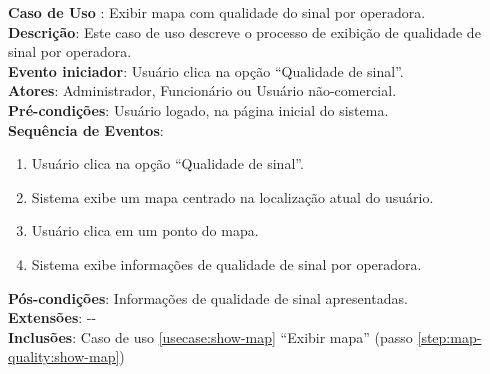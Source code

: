 \documentclass[]{politex}
\begin{document}
\noindent \textbf{Caso de Uso }: Exibir mapa com qualidade
do sinal por
operadora. \\
\textbf{Descrição}: Este caso de uso descreve o processo de exibição de
qualidade de sinal por operadora. \\
\textbf{Evento iniciador}: Usuário clica na opção ``Qualidade de sinal''. \\
\textbf{Atores}: Administrador, Funcionário ou Usuário não-comercial. \\
\textbf{Pré-condições}: Usuário logado, na página inicial do sistema. \\
\textbf{Sequência de Eventos}:
\begin{enumerate}
\item Usuário clica na opção ``Qualidade de sinal''.
\item\label{step:map-quality:show-map} Sistema exibe um mapa centrado na
localização atual do usuário.
\item Usuário clica em um ponto do mapa.
\item Sistema exibe informações de qualidade de sinal por operadora.
\end{enumerate}
\textbf{Pós-condições}: Informações de qualidade de sinal apresentadas. \\
\textbf{Extensões}: -{}- \\
\textbf{Inclusões}: Caso de uso \ref{usecase:show-map} ``Exibir mapa'' (passo
\ref{step:map-quality:show-map}) \\
\end{document}
